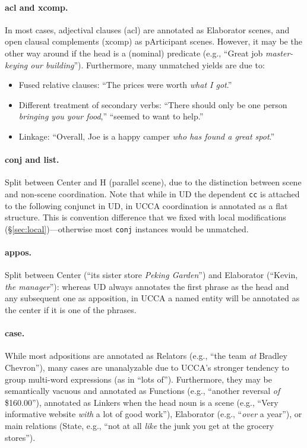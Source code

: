 \documentclass[11pt,a4paper]{article}
\begin{document}
\paragraph{acl and xcomp.}

In most cases, adjectival clauses (acl) are annotated as Elaborator scenes,
and open clausal complements (xcomp) as pArticipant scenes.
However, it may be the other way around if the head is a (nominal) predicate
(e.g., ``Great job \textit{master-keying our building}'').
Furthermore, many unmatched yields are due to:
\begin{itemize}
\item Fused relative clauses: ``The prices were worth \textit{what I got}.''
\item Different treatment of secondary verbs: ``There should only be one person \textit{bringing you your food},''
``seemed to want to help.''
\item Linkage: ``Overall, Joe is a happy camper \textit{who has found a great spot}.''
\end{itemize}

\paragraph{conj and list.}
Split between Center and H (parallel scene), due to the
distinction between scene and non-scene coordination.
Note that while in UD the dependent \verb|cc| is attached to the following conjunct in UD,
in UCCA coordination is annotated as a flat structure.
This is convention difference that we fixed with local modifications
(\S\ref{sec:local})---otherwise most \verb|conj| instances would be unmatched.

\paragraph{appos.}
Split between Center (``its sister store \textit{Peking Garden}'')
and Elaborator (``Kevin, \textit{the manager}''):
whereas UD always annotates the first phrase as the head and any subsequent one as apposition,
in UCCA a named entity will be annotated as the center if it is one of the phrases.

\paragraph{case.}
While most adpositions are annotated as Relators (e.g., ``the team \textit{at} Bradley Chevron''),
many cases are unanalyzable due to UCCA's stronger tendency to group multi-word expressions
(as in ``lots of'').
Furthermore, they may be semantically vacuous and annotated as Functions
(e.g., ``another reversal \textit{of} \$160.00''),
annotated as Linkers when the head noun is a scene
(e.g., ``Very informative website \textit{with} a lot of good work''),
Elaborator (e.g., ``\textit{over} a year''),
or main relations (State, e.g., ``not at all \textit{like} the junk you get at the grocery stores'').
\end{document}
